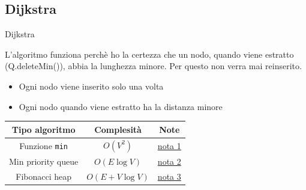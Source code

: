 \subsection{Dijkstra}
\begin{algoritmo}{Dijkstra}
	\begin{algorithm}[H]
		\caption{Dijkstra algorithm}
		\vskip3mm
		\vskip3mm


	\end{algorithm}
\end{algoritmo}
\vskip3mm
L'algoritmo funziona perchè ho la certezza che un nodo, quando viene estratto ({\ttfamily Q.deleteMin()}), abbia la lunghezza minore. Per questo non verra mai reinserito.
\begin{itemize}
	\item Ogni nodo viene inserito solo una volta
	\item Ogni nodo quando viene estratto ha la distanza minore
\end{itemize}
\begin{center}
	\begin{tabular}{c c c}
		\toprule
		Tipo algoritmo      & Complesità                     & Note                                         \\
		\midrule
		Funzione \verb|min| & $ O\left(V^2 \right) $         & \hyperlink{bellamn complexity note1}{nota 1} \\
		Min priority queue  & $ O\left(E \log V\right) $     & \hyperlink{bellamn complexity note2}{nota 2} \\
		Fibonacci heap      & $ O\left(E + V \log V\right) $ & \hyperlink{bellamn complexity note3}{nota 3} \\
		\bottomrule
	\end{tabular}
\end{center}
